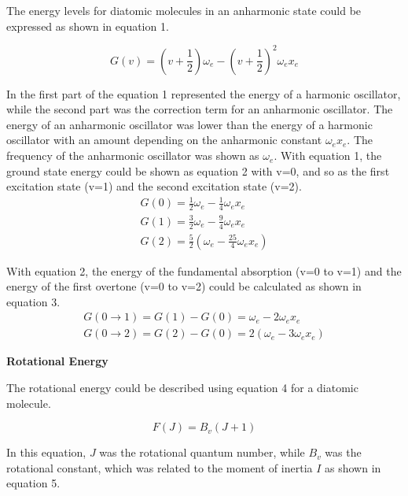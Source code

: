 \documentclass[twocolumn]{article} %
\begin{document}
The energy levels for diatomic molecules in an anharmonic state could be expressed as shown in equation 1.

\begin{equation}
    G(v) = (v + \frac{1}{2}) \omega_e - (v + \frac{1}{2})^2\omega_ex_e \label{eq.1}
\end{equation}

In the first part of the equation 1 represented the energy of a harmonic oscillator, while the second part was the correction term for an anharmonic oscillator. The energy of an anharmonic oscillator was lower than the energy of a harmonic oscillator with an amount depending on the anharmonic constant $\omega_ex_e$. The frequency of the anharmonic oscillator was shown as $\omega_e$. With equation 1, the ground state energy could be shown as equation 2 with v=0, and so as the first excitation state (v=1) and the second excitation state (v=2).
\begin{subequations}
    \begin{align}
        G(0) = \frac{1}{2}\omega_e - \frac{1}{4}\omega_ex_e \\
        G(1) = \frac{3}{2}\omega_e - \frac{9}{4}\omega_ex_e \\
        G(2) = \frac{5}{2}(\omega_e -\frac{25}{4}\omega_ex_e) 
    \end{align}
\end{subequations}

With equation 2, the energy of the fundamental absorption (v=0 to v=1) and the energy of the first overtone (v=0 to v=2) could be calculated as shown in equation 3. 
\begin{subequations}
    \begin{align}
        G(0 \rightarrow 1) = G(1) - G(0) = \omega_e - 2\omega_ex_e \\
        G(0 \rightarrow 2) = G(2) - G(0) = 2(\omega_e - 3\omega_ex_e) 
    \end{align}
\end{subequations}

\textbf{Rotational Energy}

The rotational energy could be described using equation 4 for a diatomic molecule.

\begin{equation}
    F(J) = B_v(J + 1) \label{eq.4}
\end{equation}

In this equation, $J$ was the rotational quantum number, while $B_v$ was the rotational constant, which was related to the moment of inertia $I$ as shown in equation 5. 
\end{document}

